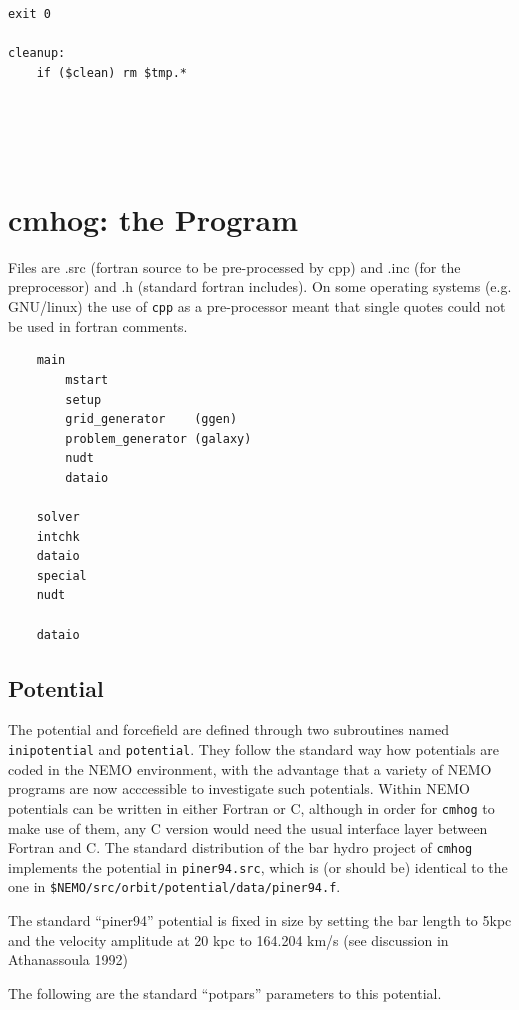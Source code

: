 \documentclass[10pt,dvips]{article}
\begin{document}
{\begin{verbatim}
exit 0

cleanup:
    if ($clean) rm $tmp.*





\end{verbatim}\normalsize



\section{cmhog: the Program}

Files are .src (fortran source to be pre-processed by cpp) and 
.inc (for the preprocessor) and .h (standard fortran includes).
On some operating systems (e.g. GNU/linux) the use of
{\tt cpp} as a pre-processor meant that single quotes could 
not be used in fortran comments.

\begin{verbatim}
    main    
        mstart
	    setup
	    grid_generator    (ggen)
	    problem_generator (galaxy)
	    nudt
        dataio
	
	solver
	intchk
	dataio
	special
	nudt
	
	dataio
\end{verbatim}

\subsection{Potential}

The potential and forcefield are defined through two subroutines
named {\tt inipotential} and {\tt potential}. They follow the
standard way how potentials are coded in the NEMO environment,
with the advantage that a variety of NEMO programs are now 
acccessible to investigate such potentials. Within NEMO potentials
can be written in either Fortran or C, although in order for
{\tt cmhog} to make use of them, any C version would need the
usual interface layer between Fortran and C. The standard distribution
of the bar hydro project of {\tt cmhog} implements the potential
in {\tt piner94.src}, which is (or should be) identical to the
one in {\tt \$NEMO/src/orbit/potential/data/piner94.f}.

The standard ``piner94'' potential is fixed in size by
setting the bar length to 5kpc and the velocity amplitude
at 20 kpc to 164.204 km/s (see discussion in Athanassoula 1992)

The following are the standard ``potpars'' parameters to this potential.

}
\end{document}
